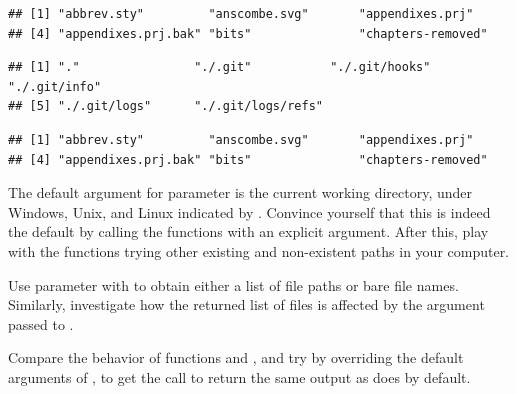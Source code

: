 \documentclass[krantz2]{krantz}\usepackage{knitr}
\begin{document}
\begin{knitrout}\footnotesize
{}\color{fgcolor}\begin{kframe}
\begin{alltt}
\hlstd{(}\hlstd{())}
\end{alltt}
\begin{verbatim}
## [1] "abbrev.sty"         "anscombe.svg"       "appendixes.prj"    
## [4] "appendixes.prj.bak" "bits"               "chapters-removed"
\end{verbatim}
\begin{alltt}
\hlstd{(}\hlstd{())}
\end{alltt}
\begin{verbatim}
## [1] "."                "./.git"           "./.git/hooks"     "./.git/info"     
## [5] "./.git/logs"      "./.git/logs/refs"
\end{verbatim}
\begin{alltt}
\hlstd{(}\hlstd{())}
\end{alltt}
\begin{verbatim}
## [1] "abbrev.sty"         "anscombe.svg"       "appendixes.prj"    
## [4] "appendixes.prj.bak" "bits"               "chapters-removed"
\end{verbatim}
\end{kframe}
\end{knitrout}

\begin{playground}
The default argument for parameter  is the current working directory, under Windows, Unix, and Linux indicated by . Convince yourself that this is indeed the default by calling the functions with an explicit argument. After this, play with the functions trying other existing and non-existent paths in your computer.
\end{playground}

\begin{playground}
Use parameter  with  to obtain either a list of file paths or bare file names. Similarly, investigate how the returned list of files is affected by the argument passed to .
\end{playground}

\begin{playground}
Compare the behavior of functions  and , and try by overriding the default arguments of , to get the call to return the same output as  does by default.
\end{playground}
\end{document}
